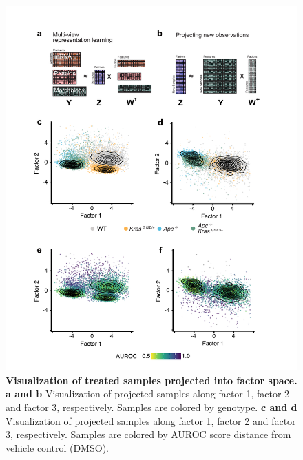 \begin{flushleft}
\begin{figure}[h]
\centering
\includegraphics[scale=0.75,
                keepaspectratio]{figures/adenomaprofiling/pdf/fig_5_0.pdf}
\caption[Visualization of treated samples projected into factor space]{\textbf{Visualization of treated samples projected into factor space. a and b} Visualization of projected samples along factor 1, factor 2 and factor 3, respectively. Samples are colored by genotype. \textbf{c and d} Visualization of projected samples along factor 1, factor 2 and factor 3, respectively. Samples are colored by AUROC score distance from vehicle control (DMSO).}
\label{fig_500}
\end{figure}
\bigbreak



\end{flushleft}
